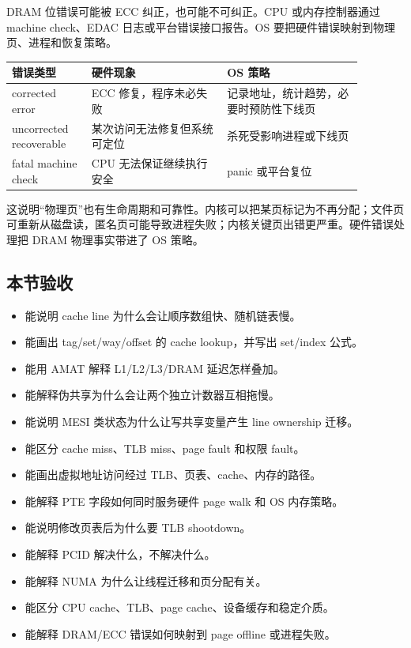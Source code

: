 DRAM 位错误可能被 ECC 纠正，也可能不可纠正。CPU 或内存控制器通过 machine check、EDAC 日志或平台错误接口报告。OS 要把硬件错误映射到物理页、进程和恢复策略。

\begin{longtable}{p{0.20\linewidth}p{0.34\linewidth}p{0.34\linewidth}}
\toprule
错误类型 & 硬件现象 & OS 策略 \\
\midrule
corrected error & ECC 修复，程序未必失败 & 记录地址，统计趋势，必要时预防性下线页 \\
uncorrected recoverable & 某次访问无法修复但系统可定位 & 杀死受影响进程或下线页 \\
fatal machine check & CPU 无法保证继续执行安全 & panic 或平台复位 \\
\bottomrule
\end{longtable}

这说明“物理页”也有生命周期和可靠性。内核可以把某页标记为不再分配；文件页可重新从磁盘读，匿名页可能导致进程失败；内核关键页出错更严重。硬件错误处理把 DRAM 物理事实带进了 OS 策略。

\subsection{本节验收}

\begin{rubricbox}
\begin{itemize}
\tightlist
\item 能说明 cache line 为什么会让顺序数组快、随机链表慢。
\item 能画出 tag/set/way/offset 的 cache lookup，并写出 set/index 公式。
\item 能用 AMAT 解释 L1/L2/L3/DRAM 延迟怎样叠加。
\item 能解释伪共享为什么会让两个独立计数器互相拖慢。
\item 能说明 MESI 类状态为什么让写共享变量产生 line ownership 迁移。
\item 能区分 cache miss、TLB miss、page fault 和权限 fault。
\item 能画出虚拟地址访问经过 TLB、页表、cache、内存的路径。
\item 能解释 PTE 字段如何同时服务硬件 page walk 和 OS 内存策略。
\item 能说明修改页表后为什么要 TLB shootdown。
\item 能解释 PCID 解决什么，不解决什么。
\item 能解释 NUMA 为什么让线程迁移和页分配有关。
\item 能区分 CPU cache、TLB、page cache、设备缓存和稳定介质。
\item 能解释 DRAM/ECC 错误如何映射到 page offline 或进程失败。
\end{itemize}
\end{rubricbox}
